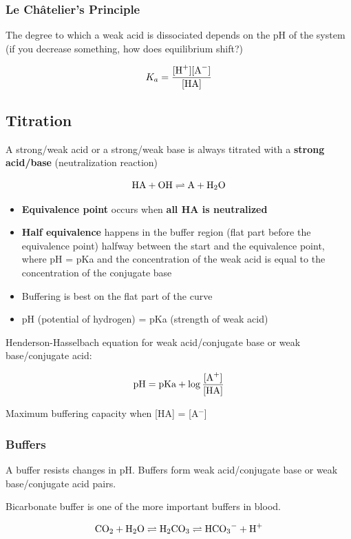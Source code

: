 \documentclass[letterpaper, 12pt]{article}
\begin{document}
\subsubsection*{Le Châtelier's Principle}

The degree to which a weak acid is dissociated depends on the pH of the system (if you decrease something, how does equilibrium shift?)

\begin{equation}
K_a = \frac{[\ce{H+}] [\ce{A-}]} {[\ce{HA}]}
\end{equation}

\subsection*{Titration}

A strong/weak acid or a strong/weak base is always titrated with a \textbf{strong acid/base} (neutralization reaction)

$$ \ce{HA} + \ce{OH} \rightleftharpoons \ce{A} + \ce{H2O} $$

\begin{itemize}
\item \textbf{Equivalence point} occurs when \textbf{all HA is neutralized}

\item \textbf{Half equivalence} happens in the buffer region (flat part before the equivalence point) halfway between the start and the equivalence point, where pH = pKa and the concentration of the weak acid is equal to the concentration of the conjugate base

\item Buffering is best on the flat part of the curve

\item pH (potential of hydrogen) = pKa (strength of weak acid)

\end{itemize}

Henderson-Hasselbach equation for weak acid/conjugate base or weak base/conjugate acid:

\begin{equation}
\text{pH} = \text{pKa} + \log \frac{[\ce{A+}]}{[\ce{HA}]}
\end{equation}

Maximum buffering capacity when [HA] = [A$^-$]

\subsubsection*{Buffers}
A buffer resists changes in pH. Buffers form weak acid/conjugate base or weak base/conjugate acid pairs.

Bicarbonate buffer is one of the more important buffers in blood.

$$\ce{CO2} + \ce{H2O} \rightleftharpoons \ce{H2CO3} \rightleftharpoons \ce{HCO3-} + \ce{H+}$$
\end{document}

